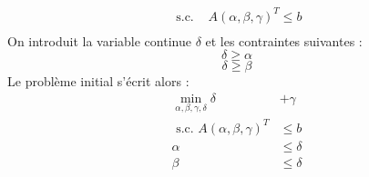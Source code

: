 \documentclass[a4paper,12pt]{article}
\begin{document}
\begin {enumerate}
{\begin{equation}
\begin{aligned}
            \text{ s.c. } & A(\alpha, \beta, \gamma)^T \leq b \\
        \end{aligned}
    \end{equation}
    On introduit la variable continue $\delta$ et les contraintes suivantes :
    $$ \delta \geq \alpha $$
    $$ \delta \geq \beta $$
    Le problème initial s'écrit alors :
    \begin{equation}
        \begin{aligned}
            \min _{\alpha, \beta, \gamma, \delta}  \delta &+ \gamma \\
            \text{ s.c. }  A(\alpha, \beta, \gamma)^T &\leq b \\
            \alpha &\leq \delta \\
            \beta &\leq \delta \\
        \end{aligned}
    \end{equation}
}



\end{enumerate}
\end{document}
